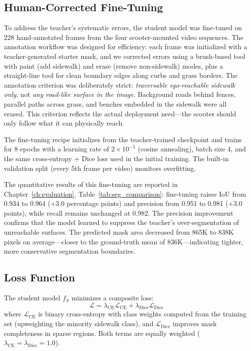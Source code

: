 \documentclass[12pt,letterpaper,oneside]{report}
\begin{document}
\subsection{Human-Corrected Fine-Tuning}
\label{sec:finetuned_seg}

To address the teacher's systematic errors, the student model was fine-tuned on 228 hand-annotated frames from the four scooter-mounted video sequences.  The annotation workflow was designed for efficiency: each frame was initialized with a teacher-generated starter mask, and we corrected errors using a brush-based tool with paint (add sidewalk) and erase (remove non-sidewalk) modes, plus a straight-line tool for clean boundary edges along curbs and grass borders.  The annotation criterion was deliberately strict: \emph{traversable ego-reachable sidewalk only}, not \emph{any road-like surface in the image}.  Background roads behind fences, parallel paths across grass, and benches embedded in the sidewalk were all erased.  This criterion reflects the actual deployment need---the scooter should only follow what it can physically reach.

The fine-tuning recipe initializes from the teacher-trained checkpoint and trains for 8 epochs with a learning rate of $2 \times 10^{-5}$ (cosine annealing), batch size 4, and the same cross-entropy + Dice loss used in the initial training.  The built-in validation split (every 5th frame per video) monitors overfitting.

The quantitative results of this fine-tuning are reported in Chapter~\ref{ch:evaluation}, Table~\ref{tab:seg_comparison}: fine-tuning raises IoU from 0.934 to 0.964 (+3.0 percentage points) and precision from 0.951 to 0.981 (+3.0 points), while recall remains unchanged at 0.982.  The precision improvement confirms that the model learned to suppress the teacher's over-segmentation of unreachable surfaces.  The predicted mask area decreased from 865K to 838K pixels on average---closer to the ground-truth mean of 836K---indicating tighter, more conservative segmentation boundaries.


\subsection{Loss Function}

The student model $f_S$ minimizes a composite loss:
\begin{equation}
\mathcal{L} = \lambda_{\text{CE}} \mathcal{L}_{\text{CE}} + \lambda_{\text{Dice}} \mathcal{L}_{\text{Dice}}
\end{equation}
where $\mathcal{L}_{\text{CE}}$ is binary cross-entropy with class weights computed from the training set (upweighting the minority sidewalk class), and $\mathcal{L}_{\text{Dice}}$ improves mask completeness in sparse regions. Both terms are equally weighted ($\lambda_{\text{CE}} = \lambda_{\text{Dice}} = 1.0$).
\end{document}
